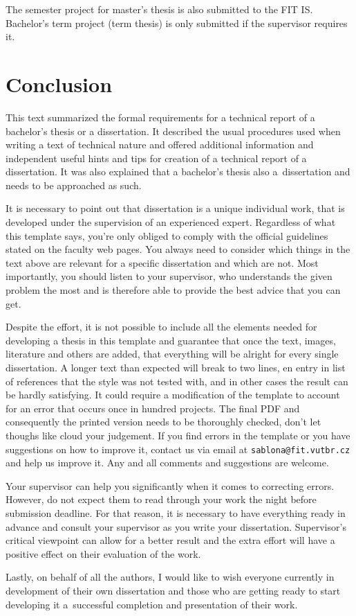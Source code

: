The semester project for master's thesis is also submitted to the FIT IS. Bachelor's term project (term thesis) is only submitted if the supervisor requires it.

\chapter{Conclusion}
\label{zaver}

This text summarized the formal requirements for a technical report of a bachelor's thesis or a dissertation. It described the usual procedures used when writing a text of technical nature and offered additional information and independent useful hints and tips for creation of a technical report of a dissertation. It was also explained that a bachelor's thesis also a~dissertation and needs to be approached as such.

It is necessary to point out that dissertation is a unique individual work, that is developed under the supervision of an experienced expert. Regardless of what this template says, you're only obliged to comply with the official guidelines stated on the faculty web pages. You always need to consider which things in the text above are relevant for a specific dissertation and which are not. Most importantly, you should listen to your supervisor, who understands the given problem the most and is therefore able to provide the best advice that you can get.

Despite the effort, it is not possible to include all the elements needed for developing a thesis in this template and guarantee that once the text, images, literature and others are added, that everything will be alright for every single dissertation. A longer text than expected will break to two lines, en entry in list of references that the style was not tested with, and in other cases the result can be hardly satisfying. It could require a modification of the template to account for an error that occurs once in hundred projects. The final PDF and consequently the printed version needs to be thoroughly checked, don't let thoughs like  cloud your judgement. If you find errors in the template or you have suggestions on how to improve it, contact us via email at \texttt{sablona@fit.vutbr.cz} and help us improve it. Any and all comments and suggestions are welcome.

Your supervisor can help you significantly when it comes to correcting errors. However, do not expect them to read through your work the night before submission deadline. For that reason, it is necessary to have everything ready in advance and consult your supervisor as you write your dissertation. Supervisor's critical viewpoint can allow for a better result and the extra effort will have a positive effect on their evaluation of the work.


Lastly, on behalf of all the authors, I would like to wish everyone currently in development of their own dissertation and those who are getting ready to start developing it a~successful completion and presentation of their work.

